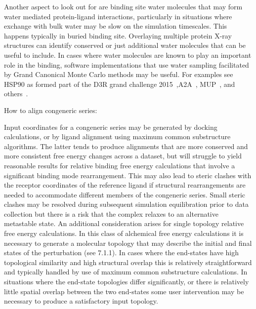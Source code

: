 \documentclass[9pt,bestpractices]{livecoms}
\begin{document}
Another aspect to look out for are binding site water molecules that may form water mediated protein-ligand interactions, particularly in situations where exchange with bulk water may be slow on the simulation timescales. This happens typically in buried binding site. Overlaying multiple protein X-ray structures can identify conserved or just additional water molecules that can be useful to include. In cases where water molecules are known to play an important role in the binding, software implementations that use water sampling facilitated by Grand Canonical Monte Carlo methods may be useful. For examples see HSP90 as formed part of the D3R grand challenge 2015~\cite{mey2016blinded},A2A~\cite{brucemacdonald2018ligand}, MUP~\cite{ross2015water}, and others~\cite{michel2009energetics}.

How to align congeneric series:

Input coordinates for a congeneric series may be generated by docking calculations, or by ligand alignment using maximum common substructure algorithms. The latter tends to produce alignments that are more conserved and more consistent free energy changes across a dataset, but will struggle to yield reasonable results for relative binding free energy calculations that involve a significant binding mode rearrangement. This may also lead to steric clashes with the receptor coordinates of the reference ligand if structural rearrangements are needed to accommodate different members of the congeneric series. Small steric clashes may be resolved during subsequent simulation equilibration prior to data collection but there is a risk that the complex relaxes to an alternative metastable state. 
An additional consideration arises for single topology relative free energy calculations. In this class of alchemical free energy calculations it is necessary to generate a molecular topology that may describe the initial and final states of the perturbation (see 7.1.1). In cases where the end-states have high topological similarity and high structural overlap this is relatively straightforward and typically handled by use of maximum common substructure calculations. In situations where the end-state topologies differ significantly, or there is relatively little spatial overlap between the two end-states some user intervention may be necessary to produce a satisfactory input topology.
\end{document}
